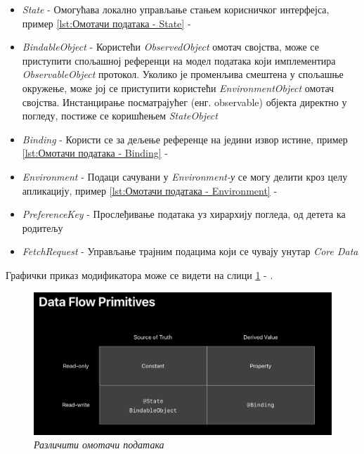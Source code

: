 \documentclass[12pt,oneside]{memoir}
\begin{document}
\begin{itemize}
    \item \textit{State} - Омогућава локално управљање стањем корисничког интерфејса, пример \ref{lst:Омотачи података - State} - 
    \item \textit{BindableObject} - Користећи \textit{ObservedObject} омотач својства, може се приступити спољашној референци на модел података који имплементира \textit{ObservableObject} протокол. Уколико је променљива смештена у спољашње окружење, може јој се приступити користећи \textit{EnvironmentObject} омотач својства. Инстанцирање посматрајућег (енг. observable) објекта директно у погледу, постиже се коришћењем \textit{StateObject}
    \item \textit{Binding} - Користи се за дељење референце на једини извор истине, пример \ref{lst:Омотачи података - Binding} - 
    \item \textit{Environment} - Подаци сачувани у \textit{Environment-у} се могу делити кроз целу апликацију, пример \ref{lst:Омотачи података - Environment} - 
    \item \textit{PreferenceKey} - Прослеђивање података уз хирархију погледа, од детета ка родитељу
    \item \textit{FetchRequest} - Управљање трајним подацима који се чувају унутар \textit{Core Data}
\end{itemize}

Графички приказ модификатора може се видети на слици \ref{slika:data_flow_primitives} - .

\begin{figure}[H]
\includegraphics[width=1\textwidth]{images/DataFlowPrimitives.png}
\centering
\caption{\textit{Различити омотачи података}}
\label{slika:data_flow_primitives}
\end{figure}
\end{document}
